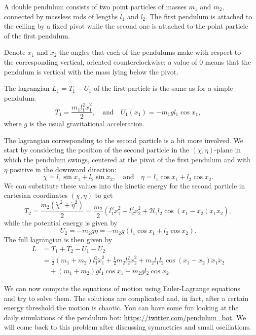 \documentclass[english,fontsize=11pt,paper=a5,oneside]{scrbook}
\theoremstyle{definition}
\newenvironment{example}
  {\pushQED{\qed}\renewcommand{\qedsymbol}{$\lozenge$}\examplex}
  {\popQED\endexamplex}
\begin{document}
\begin{example}[Double pendulum]\label{ex:2pendulum}
  A double pendulum consists of two point particles of masses $m_1$ and $m_2$, connected by massless rods of lengths $l_1$ and $l_2$. The first pendulum is attached to the ceiling by a fixed pivot while the second one is attached to the point particle of the first pendulum.

   Denote $x_1$ and $x_2$ the angles that each of the pendulums make with respect to the corresponding vertical, oriented counterclockwise: a value of $0$ means that the pendulum is vertical with the mass lying below the pivot.

  The lagrangian $L_1 = T_1 - U_1$ of the first particle is the same as for a simple pendulum:
  \begin{equation}
    T_1 = \frac{m_1 l_1^2 \dot x_1^2}2,
    \quad\mbox{and}\quad
    U_1(x_1) = -m_1 g l_1 \cos x_1,
  \end{equation}
  where $g$ is the usual gravitational acceleration.

  The lagrangian corresponding to the second particle is a bit more involved. We start by considering the position of the second particle in the $(\chi,\eta)$-plane in which the pendulum swings, centered at the pivot of the first pendulum and with $\eta$ positive in the downward direction:
  \begin{equation}
    \chi = l_1\sin x_1 + l_2\sin x_2,
    \quad\mbox{and}\quad
    \eta = l_1\cos x_1 + l_2\cos x_2.
  \end{equation}
  We can substitute these values into the kinetic energy for the second particle in cartesian coordinates $(\chi,\eta)$ to get
  \begin{equation}
    T_2 = \frac {m_2 (\dot\chi^2 + \dot\eta^2)}2
    = \frac {m_2}2 \left(
    l_1^2 \dot x_1^2 + l_2^2 \dot x_2^2
    + 2l_1l_2 \cos(x_1 -x_2)\dot x_1 \dot x_2
    \right),
  \end{equation}
  while the potential energy is given by
  \begin{equation}
    U_2 = -m_2 g \eta = -m_2g (l_1\cos x_1 + l_2\cos x_2).
  \end{equation}
  The full lagrangian is then given by
  \begin{align}
    L & = T_1 + T_2 - U_1 - U_2                 \\
      & = \frac12 (m_1 + m_2)  l_1^2 \dot x_1^2
    + \frac 12 m_2 l_2^2 \dot x_2^2
    + m_2l_1l_2 \cos(x_1 -x_2)\dot x_1 \dot x_2 \\
      & \quad+ (m_1 + m_2) g l_1 \cos x_1
    + m_2gl_2\cos x_2.
  \end{align}

  We can now compute the equations of motion using Euler-Lagrange equations and try to solve them.
  The solutions are complicated and, in fact, after a certain energy threshold the motion is chaotic.
  You can have some fun looking at the daily simulations of the pendulum bot: \url{https://twitter.com/pendulum_bot}.
  We will come back to this problem after discussing symmetries and small oscillations.
\end{example}
\end{document}
